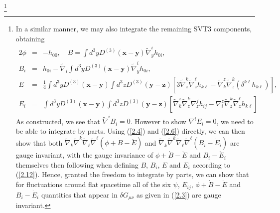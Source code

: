 	\footnote{
	In a similar manner, we may also integrate the remaining SVT3 components, obtaining
	\begin{eqnarray}
	2\phi&=&-h_{00},\quad
	B=\int d^3yD^{(3)}(\mathbf{x}-\mathbf{y})\tilde{\nabla}_y^ih_{0i},
	\nonumber\\
	B_i&=&h_{0i}-\tilde{\nabla}_i\int d^3yD^{(3)}(\mathbf{x}-\mathbf{y})\tilde{\nabla}_y^ih_{0i},
	\nonumber\\
	E&=&\frac{1}{4}\int d^3yD^{(3)}(\mathbf{x}-\mathbf{y})\int d^3zD^{(3)}(\mathbf{y}-\mathbf{z})\left[3\tilde{\nabla}_z^k\tilde{\nabla}_z^{\ell}h_{k\ell}-\tilde{\nabla}^z_k\tilde{\nabla}_z^k(\delta^{k\ell}h_{k\ell})\right],
	\nonumber\\
	E_i&=&\int d^3yD^{(3)}(\mathbf{x}-\mathbf{y})\int d^3zD^{(3)}(\mathbf{y}-\mathbf{z})\left[\tilde{\nabla}^z_k\tilde{\nabla}_z^k\nabla_z^jh_{ij}-\nabla^z_i\tilde{\nabla}_z^k\tilde{\nabla}_z^{\ell}h_{k\ell}\right]
	\label{2.12}
	\end{eqnarray}
	As constructed, we see that $\tilde{\nabla}^iB_i=0$. However to show $\nabla^iE_i=0$, we need to be able to integrate by parts. Using (\ref{2.4}) and (\ref{2.6}) directly, we can then show that both $\tilde{\nabla}_k\tilde{\nabla}^k\tilde{\nabla}_{\ell}\tilde{\nabla}^{\ell}(\phi+\dot{B}-\ddot{E})$ and $\tilde{\nabla}_k\tilde{\nabla}^k\tilde{\nabla}_{\ell}\tilde{\nabla}^{\ell}(B_i-\dot{E}_i)$ are gauge invariant, with the gauge invariance of $\phi+\dot{B}-\ddot{E}$ and $B_i-\dot{E}_i$ themselves then following when defining $B$, $B_i$, $E$ and $E_i$ according to (\ref{2.12}). Hence, granted the freedom to integrate by parts, we can show that for fluctuations around flat spacetime all of the six $\psi$, $E_{ij}$,  $\phi+\dot{B}-\ddot{E}$ and $B_i-\dot{E}_i$ quantities that appear in $\delta G_{\mu\nu}$ as given in (\ref{2.3}) are gauge invariant.
	}

